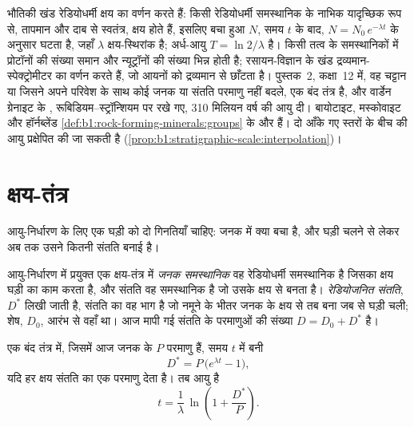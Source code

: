 \begin{recall}
भौतिकी खंड रेडियोधर्मी क्षय का वर्णन करते हैं: किसी रेडियोधर्मी समस्थानिक के नाभिक यादृच्छिक रूप से, तापमान और दाब से स्वतंत्र, क्षय होते हैं, इसलिए बचा हुआ $N$, समय $t$ के बाद, $N = N_0\,e^{-\lambda t}$ के अनुसार घटता है, जहाँ $\lambda$ क्षय-स्थिरांक है; अर्ध-आयु $T = \ln 2/\lambda$ है। किसी तत्व के समस्थानिकों में प्रोटॉनों की संख्या समान और न्यूट्रॉनों की संख्या भिन्न होती है; रसायन-विज्ञान के खंड द्रव्यमान-स्पेक्ट्रोमीटर का वर्णन करते हैं, जो आयनों को द्रव्यमान से छाँटता है। पुस्तक~2, कक्षा~12 में, वह चट्टान या  जिसने अपने परिवेश के साथ कोई जनक या संतति परमाणु नहीं बदले, एक बंद तंत्र है, और वार्डेन ग्रेनाइट के , रूबिडियम–स्ट्रॉन्शियम  पर रखे गए, 310 मिलियन वर्ष की आयु दी। बायोटाइट, मस्कोवाइट और हॉर्नब्लेंड \cref{def:b1:rock-forming-minerals:groups} के  और  हैं। दो आँके गए स्तरों के बीच की आयु प्रक्षेपित की जा सकती है (\cref{prop:b1:stratigraphic-scale:interpolation})।
\end{recall}

\section{क्षय-तंत्र}\label{sec:b1:radiometric-methods:systems}

आयु-निर्धारण के लिए एक घड़ी को दो गिनतियाँ चाहिए: जनक में क्या बचा है, और घड़ी चलने से लेकर अब तक उसने कितनी संतति बनाई है।

\begin{definition}\label{def:b1:radiometric-methods:radiogenic}
आयु-निर्धारण में प्रयुक्त एक क्षय-तंत्र में \emph{जनक समस्थानिक} वह रेडियोधर्मी समस्थानिक है जिसका क्षय घड़ी का काम करता है, और संतति वह समस्थानिक है जो उसके क्षय से बनता है। \emph{रेडियोजनित संतति}, $D^*$ लिखी जाती है, संतति का वह भाग है जो नमूने के भीतर जनक के क्षय से तब बना जब से घड़ी चली; शेष, $D_0$, आरंभ से वहाँ था। आज मापी गई संतति के परमाणुओं की संख्या $D = D_0 + D^*$ है।
\end{definition}

\begin{proposition}[रेडियोजनित वृद्धि और आयु-समीकरण]\label{prop:b1:radiometric-methods:growth}
एक बंद तंत्र में, जिसमें आज जनक के $P$ परमाणु हैं, समय $t$ में बनी 
\[
  D^* = P\,\bigl(e^{\lambda t} - 1\bigr),
\]
यदि हर क्षय संतति का एक परमाणु देता है। तब आयु है
\[
  t = \frac{1}{\lambda}\,\ln\!\left(1 + \frac{D^*}{P}\right).
\]
\end{proposition}

